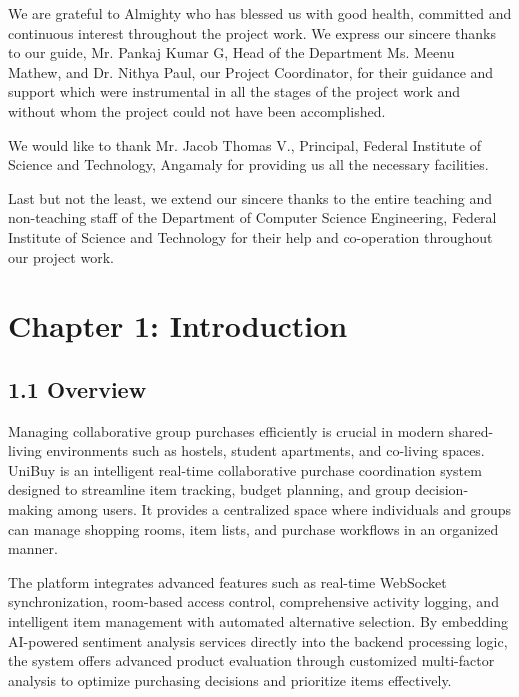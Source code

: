 \documentclass[a4paper,12pt]{article}
\begin{document}
We are grateful to Almighty who has blessed us with good health, committed and continuous interest throughout the project work. We express our sincere thanks to our guide, Mr. Pankaj Kumar G, Head of the Department Ms. Meenu Mathew, and Dr. Nithya Paul, our Project Coordinator, for their guidance and support which were instrumental in all the stages of the project work and without whom the project could not have been accomplished.

We would like to thank Mr. Jacob Thomas V., Principal, Federal Institute of Science and Technology, Angamaly for providing us all the necessary facilities.

Last but not the least, we extend our sincere thanks to the entire teaching and non-teaching staff of the Department of Computer Science Engineering, Federal Institute of Science and Technology for their help and co-operation throughout our project work.

\tableofcontents
\listoffigures
\listoftables

\newpage
\section*{Chapter 1: Introduction}

\subsection*{1.1 Overview}
Managing collaborative group purchases efficiently is crucial in modern shared-living environments such as hostels, student apartments, and co-living spaces. UniBuy is an intelligent real-time collaborative purchase coordination system designed to streamline item tracking, budget planning, and group decision-making among users. It provides a centralized space where individuals and groups can manage shopping rooms, item lists, and purchase workflows in an organized manner.

The platform integrates advanced features such as real-time WebSocket synchronization, room-based access control, comprehensive activity logging, and intelligent item management with automated alternative selection. By embedding AI-powered sentiment analysis services directly into the backend processing logic, the system offers advanced product evaluation through customized multi-factor analysis to optimize purchasing decisions and prioritize items effectively. 
\end{document}
